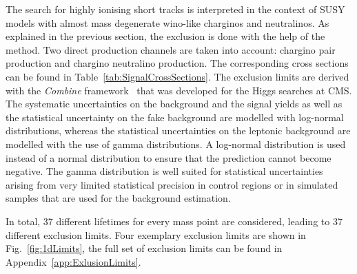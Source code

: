 The search for highly ionising short tracks is interpreted in the context of SUSY models with almost mass degenerate wino-like charginos and neutralinos.
As explained in the previous section, the exclusion is done with the help of the \CLs method.
Two direct production channels are taken into account: chargino pair production and chargino neutralino production. 
The corresponding cross sections can be found in Table~\ref{tab:SignalCrossSections}.
The exclusion limits are derived with the \textit{Combine} framework~\cite{bib:CMS:Combine} that was developed for the Higgs searches at CMS.
The systematic uncertainties on the background and the signal yields as well as the statistical uncertainty on the fake background are modelled with log-normal distributions, 
whereas the statistical uncertainties on the leptonic background are modelled with the use of gamma distributions.
A log-normal distribution is used instead of a normal distribution to ensure that the prediction cannot become negative.
The gamma distribution is well suited for statistical uncertainties arising from very limited statistical precision in control regions or in simulated samples that are used for the background estimation.

In total, 37 different lifetimes for every mass point are considered, leading to 37 different exclusion limits.
Four exemplary exclusion limits are shown in Fig.~\ref{fig:1dLimits}, the full set of exclusion limits can be found in Appendix~\ref{app:ExlusionLimits}.

